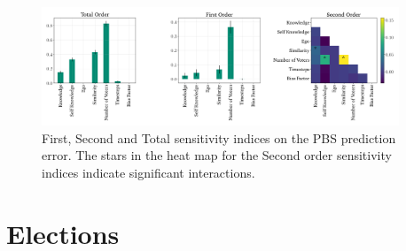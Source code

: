 \begin{figure}[h]
	\begin{center}
		\includegraphics[width=0.95\textwidth]{Figures/senstivity_analysis.png}
	\end{center}
	\caption{First, Second and Total sensitivity indices on the PBS prediction error. The stars in the heat map for the Second order sensitivity indices indicate significant interactions. }\label{fig:sensitivty_pbs}
\end{figure}


\section{Elections}


